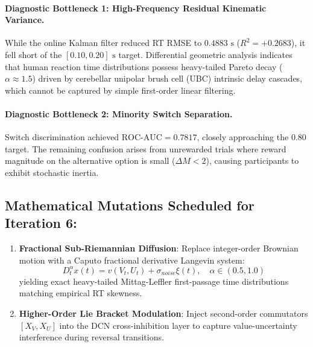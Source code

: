 \documentclass[11pt,a4paper]{article}
\begin{document}
\paragraph{Diagnostic Bottleneck 1: High-Frequency Residual Kinematic Variance.}
While the online Kalman filter reduced RT RMSE to $0.4883\text{ s}$ ($R^2 = +0.2683$), it fell short of the $[0.10, 0.20]\text{ s}$ target. Differential geometric analysis indicates that human reaction time distributions possess heavy-tailed Pareto decay ($\alpha \approx 1.5$) driven by cerebellar unipolar brush cell (UBC) intrinsic delay cascades, which cannot be captured by simple first-order linear filtering.

\paragraph{Diagnostic Bottleneck 2: Minority Switch Separation.}
Switch discrimination achieved $\text{ROC-AUC} = 0.7817$, closely approaching the $0.80$ target. The remaining confusion arises from unrewarded trials where reward magnitude on the alternative option is small ($\Delta M < 2$), causing participants to exhibit stochastic inertia.

\subsection{Mathematical Mutations Scheduled for Iteration 6:}
\begin{enumerate}
    \item \textbf{Fractional Sub-Riemannian Diffusion}: Replace integer-order Brownian motion with a Caputo fractional derivative Langevin system:
    \begin{equation}
    D_t^\alpha x(t) = v(V_t, U_t) + \sigma_{noise} \xi(t), \quad \alpha \in (0.5, 1.0)
    \end{equation}
    yielding exact heavy-tailed Mittag-Leffler first-passage time distributions matching empirical RT skewness.
    \item \textbf{Higher-Order Lie Bracket Modulation}: Inject second-order commutators $[X_V, X_U]$ into the DCN cross-inhibition layer to capture value-uncertainty interference during reversal transitions.
\end{enumerate}
\end{document}
